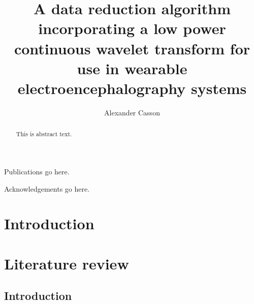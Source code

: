 \documentclass[times,thesis]{uom_thesis_casson} %
\begin{document}
\title{A data reduction algorithm incorporating a low power continuous wavelet transform for use in wearable electroencephalography systems}
\author{Alexander Casson}
\maketitle

\uomtoc %
\uomlof
\uomlot
\begin{uomlop} %
Publications go here.
\end{uomlop}

\begin{abstract} %
  This is abstract text.
\end{abstract}%
\clearpage 

\uomdeclarations %

\begin{uomacknowledgements} %
Acknowledgements go here.
\end{uomacknowledgements}

\chapter{Introduction} %
  \lipsum[1-5] %

\chapter{Literature review}

  \section{Introduction}
  \lipsum[1] 
  
\end{document}
